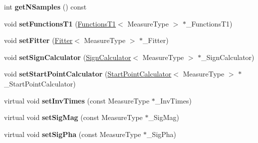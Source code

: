 \begin{DoxyCompactItemize}
\item 
\hypertarget{class_ox_1_1_calculator_t1_a8a11b3b6c0dcbc461c11dc55600d7992}{int {\bfseries get\-N\-Samples} () const }\label{class_ox_1_1_calculator_t1_a8a11b3b6c0dcbc461c11dc55600d7992}

\item 
\hypertarget{class_ox_1_1_calculator_t1_a88e23f6ffa2903dc14a6133a90203f02}{void {\bfseries set\-Functions\-T1} (\hyperlink{class_ox_1_1_functions_t1}{Functions\-T1}$<$ Measure\-Type $>$ $\ast$\-\_\-\-Functions\-T1)}\label{class_ox_1_1_calculator_t1_a88e23f6ffa2903dc14a6133a90203f02}

\item 
\hypertarget{class_ox_1_1_calculator_t1_a106746ffcc08288c933c4dc210589f35}{void {\bfseries set\-Fitter} (\hyperlink{class_ox_1_1_fitter}{Fitter}$<$ Measure\-Type $>$ $\ast$\-\_\-\-Fitter)}\label{class_ox_1_1_calculator_t1_a106746ffcc08288c933c4dc210589f35}

\item 
\hypertarget{class_ox_1_1_calculator_t1_ae043a486f1db48e46a3e011e4a3d76b3}{void {\bfseries set\-Sign\-Calculator} (\hyperlink{class_ox_1_1_sign_calculator}{Sign\-Calculator}$<$ Measure\-Type $>$ $\ast$\-\_\-\-Sign\-Calculator)}\label{class_ox_1_1_calculator_t1_ae043a486f1db48e46a3e011e4a3d76b3}

\item 
\hypertarget{class_ox_1_1_calculator_t1_a89628a47da5bf7baddcd87f687613096}{void {\bfseries set\-Start\-Point\-Calculator} (\hyperlink{class_ox_1_1_start_point_calculator}{Start\-Point\-Calculator}$<$ Measure\-Type $>$ $\ast$\-\_\-\-Start\-Point\-Calculator)}\label{class_ox_1_1_calculator_t1_a89628a47da5bf7baddcd87f687613096}

\item 
\hypertarget{class_ox_1_1_calculator_t1_aa01e3820da27a63092b08abcc7916226}{virtual void {\bfseries set\-Inv\-Times} (const Measure\-Type $\ast$\-\_\-\-Inv\-Times)}\label{class_ox_1_1_calculator_t1_aa01e3820da27a63092b08abcc7916226}

\item 
\hypertarget{class_ox_1_1_calculator_t1_a08560d67cd2da853806fee5c8a3bdc40}{virtual void {\bfseries set\-Sig\-Mag} (const Measure\-Type $\ast$\-\_\-\-Sig\-Mag)}\label{class_ox_1_1_calculator_t1_a08560d67cd2da853806fee5c8a3bdc40}

\item 
\hypertarget{class_ox_1_1_calculator_t1_a0437c6f96080bc1ba7175422cd2f555a}{virtual void {\bfseries set\-Sig\-Pha} (const Measure\-Type $\ast$\-\_\-\-Sig\-Pha)}\label{class_ox_1_1_calculator_t1_a0437c6f96080bc1ba7175422cd2f555a}


\end{DoxyCompactItemize}
